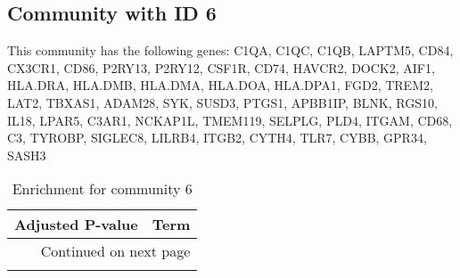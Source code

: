 \subsection*{Community with ID 6}
This community has the following genes: C1QA, C1QC, C1QB, LAPTM5, CD84, CX3CR1, CD86, P2RY13, P2RY12, CSF1R, CD74, HAVCR2, DOCK2, AIF1, HLA.DRA, HLA.DMB, HLA.DMA, HLA.DOA, HLA.DPA1, FGD2, TREM2, LAT2, TBXAS1, ADAM28, SYK, SUSD3, PTGS1, APBB1IP, BLNK, RGS10, IL18, LPAR5, C3AR1, NCKAP1L, TMEM119, SELPLG, PLD4, ITGAM, CD68, C3, TYROBP, SIGLEC8, LILRB4, ITGB2, CYTH4, TLR7, CYBB, GPR34, SASH3
\\
\begin{longtable}{p{2.4cm}p{14.5cm}}
\caption{Enrichment for community 6}\\
\toprule
Adjusted \newline P-value &                                                                                                Term \\
\midrule
\endhead
\midrule
\multicolumn{2}{r}{{Continued on next page}} \\
\midrule
\endfoot


\end{longtable}
